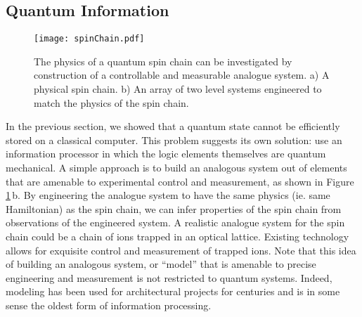 \subsection{Quantum Information}

\begin{figure}
\begin{centering}
\texttt{[image: spinChain.pdf]}
\par\end{centering}
\caption{The physics of a quantum spin chain can be investigated by construction of a controllable and measurable analogue system. a) A physical spin chain. b) An array of two level systems engineered to match the physics of the spin chain.}
\label{Fig:spinChain}
\end{figure}

In the previous section, we showed that a quantum state cannot be efficiently stored on a classical computer.
This problem suggests its own solution: use an information processor in which the logic elements themselves are quantum mechanical.
A simple approach is to build an analogous system out of elements that are amenable to experimental control and measurement, as shown in Figure\,\ref{Fig:spinChain}\,b.
By engineering the analogue system to have the same physics (ie. same Hamiltonian) as the spin chain, we can infer properties of the spin chain from observations of the engineered system.
A realistic analogue system for the spin chain could be a chain of ions trapped in an optical lattice.
Existing technology allows for exquisite control and measurement of trapped ions.
Note that this idea of building an analogous system, or ``model'' that is amenable to precise engineering and measurement is not restricted to quantum systems.
Indeed, modeling has been used for architectural projects for centuries and is in some sense the oldest form of information processing.

